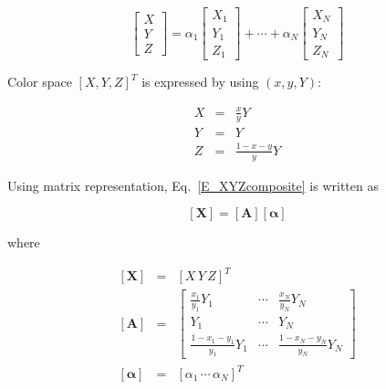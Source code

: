 \documentclass[dvipdfmx,uplatex,a4paper]{article}
\begin{document}
\begin{equation}
  \label{E_XYZcomposite}
  \left[
    \begin{array}{c}
      X \\
      Y \\
      Z
    \end{array}
  \right]
   = \alpha_1
  \left[
    \begin{array}{c}
        X_1 \\
        Y_1 \\
        Z_1
    \end{array}
  \right]
   + \cdots + \alpha_N
  \left[
    \begin{array}{c}
        X_N \\
        Y_N \\
        Z_N
    \end{array}
  \right]
\end{equation}

Color space $[X, Y, Z]^T$ is expressed by using $(x, y, Y)$:

\begin{eqnarray}
  \label{E_xyY2XYZ}
  X & = & \frac{x}{y}  Y \\
  Y & = & Y \\
  Z & = & \frac{1 - x - y}{y} Y
\end{eqnarray}

Using matrix representation, Eq.~\eqref{E_XYZcomposite} is written as

\begin{equation}
  \label{E_X=AY}
  \left[ \boldsymbol{X} \right] =
  \left[ \boldsymbol{A} \right]
  \left[ \boldsymbol{\alpha} \right]
\end{equation}

\noindent
where

\begin{eqnarray}
  \left[ \boldsymbol{X} \right] &=&
  \left[ X \, Y \, Z \right]^T \label{E_XYZ^T} \\
%
  \left[ \boldsymbol{A} \right] &=&
  \left[
    \begin{array}{ccc}
      \frac{x_1}{y_1} Y_1 & \cdots & \frac{x_N}{y_N} Y_N \\
      Y_1 & \cdots & Y_N \\
      \frac{1 - x_1 - y_1}{y_1}Y_1 & \cdots & \frac{1 - x_N - y_N}{y_N}Y_N
    \end{array}
  \right] \\
%
  \left[ \boldsymbol{\alpha} \right] &=&
  \left[ \alpha_1\, \cdots\, \alpha_N \right]^T
\end{eqnarray}
\end{document}
